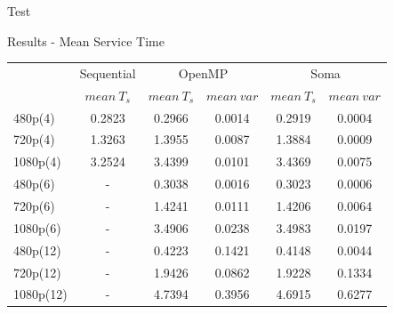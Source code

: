 \documentclass[xcolor=dvipsnames]{beamer}
\begin{document}
\begin{section}{Test}
\begin{frame}{\hskip 0.3cm Results - Mean Service Time}
\begin{center}
{\begin{tabular}{| l || c || c | c || c | c |}
\hline
 & \multicolumn{1}{|c||}{Sequential} & \multicolumn{2}{|c||}{OpenMP} & \multicolumn{2}{|c|}{Soma} \\
\cline{2-6}
  & $mean\ T_s$ & $mean\ T_s$ & $mean\ var$ & $mean\ T_s$ & $mean\ var$ \\
\cline{2-6}
\hline
480p(4) & 0.2823 & 0.2966 & 0.0014 & 0.2919 & 0.0004 \\
\hline
720p(4) & 1.3263 & 1.3955 & 0.0087 & 1.3884 & 0.0009 \\
\hline
1080p(4) & 3.2524 & 3.4399 & 0.0101 & 3.4369 & 0.0075 \\
\hline 
\hline
480p(6) & - & 0.3038 & 0.0016 & 0.3023 & 0.0006 \\
\hline
720p(6) & - & 1.4241 & 0.0111 & 1.4206 & 0.0064 \\
\hline
1080p(6) & - & 3.4906 & 0.0238 & 3.4983 & 0.0197 \\
\hline 
\hline
480p(12) & - & 0.4223 & 0.1421 & 0.4148 & 0.0044 \\
\hline
720p(12) & - & 1.9426 & 0.0862 & 1.9228 & 0.1334 \\
\hline
1080p(12) & - & 4.7394 & 0.3956 & 4.6915 & 0.6277 \\
\hline 
\end{tabular} }
\end{center}







\end{frame}

\end{section}
\end{document}
